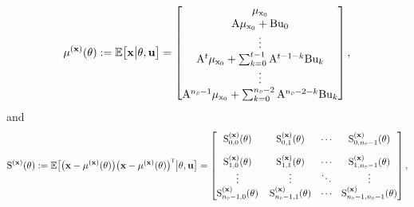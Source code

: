 \begin{equation}\label{eq:mean x}
    \begin{split}
    \mu^{(\mathbf{x})}(\vctheta) := 
    \Exp\big[\mathbf{x}\big| \vctheta, \mathbf{u}\big] = 
    \begin{bmatrix}
        \mu_{\vcx_0} \\
        \mxA\mu_{\vcx_0} + \mxB\vcu_0\\
        \vdots\\
        \mxA^t\mu_{\vcx_0} + \sum_{k=0}^{t-1}\mxA^{t-1-k}\mxB \vcu_k\\
        \vdots\\
        \mxA^{\nsD-1}\mu_{\vcx_0} + \sum_{k=0}^{\nsD-2}\mxA^{\nsD-2-k}\mxB \vcu_k\\
    \end{bmatrix},
    \end{split}
\end{equation}
and
\begin{equation}\label{eq:covariance x}
    \begin{split}
    \mxS^{(\mathbf{x})}{(\vctheta)} := 
    \Exp
    \big[
    \big(\mathbf{x}- \mu^{(\mathbf{x})}(\vctheta)\big)
    \big(\mathbf{x}- \mu^{(\mathbf{x})}(\vctheta)\big)^\tr    
    \big| \vctheta, \mathbf{u}
    \big] = 
    \begin{bmatrix}
        \mxS^{(\mathbf{x})}_{0,0}(\vctheta) & \, \mxS^{(\mathbf{x})}_{0,1}(\vctheta) & \cdots & \mxS^{(\mathbf{x})}_{0,\nsD-1}(\vctheta)\\[10pt]
        \mxS^{(\mathbf{x})}_{1,0}(\vctheta) & \, \mxS^{(\mathbf{x})}_{1,1}(\vctheta) & \cdots & \mxS^{(\mathbf{x})}_{1,\nsD-1}(\vctheta)\\
        \vdots & \, \vdots & \ddots & \vdots\\
        \mxS^{(\mathbf{x})}_{\nsD-1,0}(\vctheta) & \, \mxS^{(\mathbf{x})}_{\nsD-1,1}(\vctheta) & \cdots & \mxS^{(\mathbf{x})}_{\nsD-1,\nsD-1}(\vctheta)\\
    \end{bmatrix},
    \end{split}
\end{equation}
